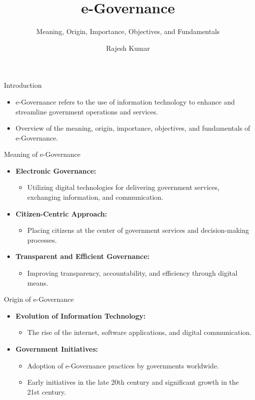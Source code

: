 \title{e-Governance}
\subtitle{Meaning, Origin, Importance, Objectives, and Fundamentals}
\author{Rajesh Kumar}
\date{}

\begin{frame}
  \titlepage
\end{frame}

\begin{frame}{Introduction}
  \begin{itemize}
    \item e-Governance refers to the use of information technology to enhance and streamline government operations and services.
    \item Overview of the meaning, origin, importance, objectives, and fundamentals of e-Governance.
  \end{itemize}
\end{frame}

\begin{frame}{Meaning of e-Governance}
  \begin{itemize}
    \item \textbf{Electronic Governance:}
      \begin{itemize}
        \item Utilizing digital technologies for delivering government services, exchanging information, and communication.
      \end{itemize}
    \item \textbf{Citizen-Centric Approach:}
      \begin{itemize}
        \item Placing citizens at the center of government services and decision-making processes.
      \end{itemize}
    \item \textbf{Transparent and Efficient Governance:}
      \begin{itemize}
        \item Improving transparency, accountability, and efficiency through digital means.
      \end{itemize}
  \end{itemize}
\end{frame}

\begin{frame}{Origin of e-Governance}
  \begin{itemize}
    \item \textbf{Evolution of Information Technology:}
      \begin{itemize}
        \item The rise of the internet, software applications, and digital communication.
      \end{itemize}
    \item \textbf{Government Initiatives:}
      \begin{itemize}
        \item Adoption of e-Governance practices by governments worldwide.
        \item Early initiatives in the late 20th century and significant growth in the 21st century.
      \end{itemize}
  \end{itemize}
\end{frame}


